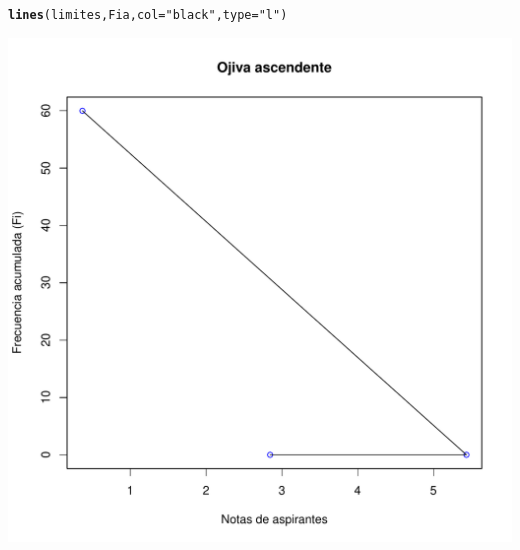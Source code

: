 \documentclass[12pt,letterpaper]{article}\usepackage[]{graphicx}\usepackage[]{color}
\makeatletter
\def\maxwidth{ %
  \ifdim\Gin@nat@width>\linewidth
    \linewidth
  \else
    \Gin@nat@width
  \fi
}
\newcommand{\hlstr}[1]{\textcolor[rgb]{0.192,0.494,0.8}{#1}}%
\newcommand{\hlstd}[1]{\textcolor[rgb]{0.345,0.345,0.345}{#1}}%
\newcommand{\hlkwc}[1]{\textcolor[rgb]{0.333,0.667,0.333}{#1}}%
\newcommand{\hlkwd}[1]{\textcolor[rgb]{0.737,0.353,0.396}{\textbf{#1}}}%
\newenvironment{kframe}{%
 \def\at@end@of@kframe{}%
 \ifinner\ifhmode%
  \def\at@end@of@kframe{\end{minipage}}%
  \begin{minipage}{\columnwidth}%
 \fi\fi%
 \def\FrameCommand##1{\hskip\@totalleftmargin \hskip-\fboxsep
 \colorbox{shadecolor}{##1}\hskip-\fboxsep
     \hskip-\linewidth \hskip-\@totalleftmargin \hskip\columnwidth}%
 \MakeFramed {\advance\hsize-\width
   \@totalleftmargin\z@ \linewidth\hsize
   \@setminipage}}%
 {\par\unskip\endMakeFramed%
 \at@end@of@kframe}
\newenvironment{knitrout}{}{} %
\makeatother
\begin{document}
\begin{enumerate}
\begin{knitrout}
\begin{kframe}
{\ttfamily\noindent\bfseries{}}\begin{alltt}
\hlkwd{lines}\hlstd{(limites, Fia,} \hlkwc{col}\hlstd{=}\hlstr{"black"}\hlstd{,} \hlkwc{type}\hlstd{=}\hlstr{"l"}\hlstd{)}
\end{alltt}
\end{kframe}
\includegraphics[width=\maxwidth]{figure/unnamed-chunk-19-1} 

\end{knitrout}


\end{enumerate}
\end{document}

